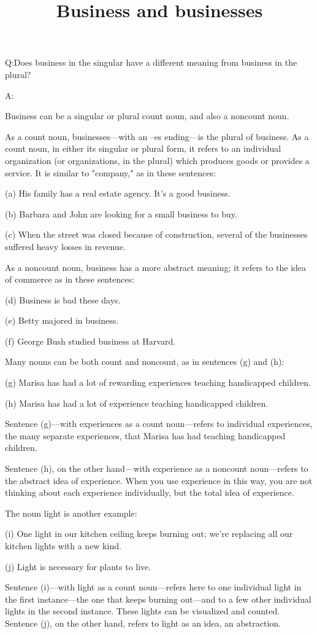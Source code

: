 \documentclass{article}
\title{Business and businesses}
\begin{document}
 

Q:Does business in the singular have a different meaning from business in the plural?


A:

Business can be a singular or plural count noun, and also a noncount noun.

As a count noun, businesses—with an –es ending—is the plural of business. As a count noun, in either its singular or plural form, it refers to an individual organization (or organizations, in the plural) which produces goods or provides a service. It is similar to "company," as in these sentences:

(a) His family has a real estate agency. It's a good business.

(b) Barbara and John are looking for a small business to buy.

(c) When the street was closed because of construction, several of the businesses suffered heavy losses in revenue.

As a noncount noun, business has a more abstract meaning; it refers to the idea of commerce as in these sentences:

(d) Business is bad these days.

(e) Betty majored in business.

(f) George Bush studied business at Harvard.

Many nouns can be both count and noncount, as in sentences (g) and (h):

(g) Marisa has had a lot of rewarding experiences teaching handicapped children.

(h) Marisa has had a lot of experience teaching handicapped children.

Sentence (g)—with experiences as a count noun—refers to individual experiences, the many separate experiences, that Marisa has had teaching handicapped children.

Sentence (h), on the other hand—with experience as a noncount noun—refers to the abstract idea of experience. When you use experience in this way, you are not thinking about each experience individually, but the total idea of experience.

The noun light is another example:

(i) One light in our kitchen ceiling keeps burning out; we're replacing all our kitchen lights with a new kind.

(j) Light is necessary for plants to live.

Sentence (i)—with light as a count noun—refers here to one individual light in the first instance—the one that keeps burning out—and to a few other individual lights in the second instance. These lights can be visualized and counted. Sentence (j), on the other hand, refers to light as an idea, an abstraction.
\end{document}
